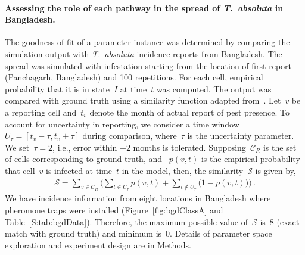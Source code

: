 \documentclass[11pt]{article}
\newcommand{\tuta}{\emph{T.~absoluta}}
\newcommand{\reportingCells}{\mathcal{C}_R}
\newcommand{\similarity}{\mathcal{S}}
\theoremstyle{definition}
\begin{document}
\paragraph{Assessing the role of each pathway in the spread of \tuta{} in
Bangladesh.} The goodness of fit of a parameter instance was determined by
comparing the
simulation output with \tuta{} incidence reports from Bangladesh. The spread was simulated with infestation starting from
the location of first report (Panchagarh, Bangladesh) and 100 repetitions.
For each cell, empirical probability that it is in state~$I$ at time~$t$
was computed. The output was compared with ground truth using a similarity
function adapted from~\cite{carrasco2010unveiling}.  Let~$v$ be a
reporting cell and~$t_v$ denote the month of actual report of pest
presence.  To account for uncertainty in reporting, we consider a time
window~$U_\tau=[t_v-\tau,t_v+\tau]$ during comparison, where~$\tau$ is the
uncertainty parameter. We set~$\tau=2$, i.e., error within $\pm2$ months is
tolerated.  Supposing~$\reportingCells$ is the set of cells corresponding
to ground truth,  and ~$p(v,t)$ is the empirical probability that cell~$v$ is
infected at time~$t$ in the model, then, the
similarity~$\similarity$ is given by,
\begin{align}\label{eqn:similarity}
    \similarity=\sum_{v\in\reportingCells} \Big(\sum_{t\in U_\tau}p(v,t)
    + \sum_{t\notin U_\tau}\big(1-p(v,t)\big) \Big)\,.
\end{align}
We have incidence information from eight locations in Bangladesh where
pheromone traps were installed (Figure~\ref{fig:bgdClassA} and
Table~\ref{S:tab:bgdData}).  Therefore, the maximum possible value
of~$\similarity$ is~$8$ (exact match with ground truth) and minimum is~$0$.
Details of parameter space exploration and experiment design are in
Methods.
\end{document}
